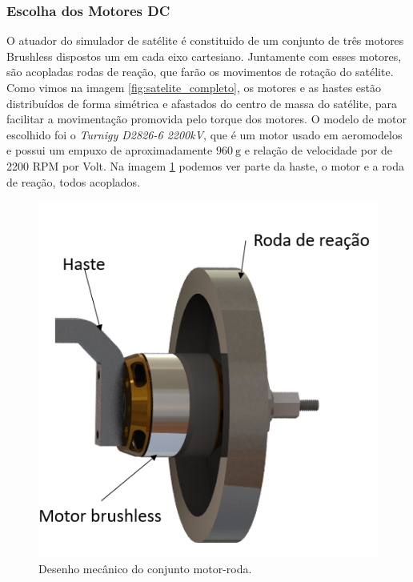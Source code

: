 
\subsubsection{Escolha dos Motores DC}

O atuador do simulador de satélite é constituido de um conjunto de três motores Brushless dispostos um em cada eixo cartesiano. Juntamente com esses motores, são acopladas rodas de reação, que farão os movimentos de rotação do satélite. Como vimos na imagem \ref{fig:satelite_completo}, os motores e as hastes estão distribuídos de forma simétrica e afastados do centro de massa do satélite, para facilitar a movimentação promovida pelo torque dos motores. O modelo de motor escolhido foi o \textit{Turnigy D2826-6 2200kV}, que é um motor usado em aeromodelos e possui um empuxo de aproximadamente $\SI{960}{\gram}$ e relação de velocidade por de 2200 RPM por Volt. Na imagem \ref{fig:motor_roda_desenho} podemos ver parte da haste, o motor e a roda de reação, todos acoplados. 

\begin{figure}[H]
  \caption{Desenho mecânico do conjunto motor-roda.}
  \begin{center}
      \includegraphics[scale=.45]{metodologia/img/motor_roda_desenho}
  \end{center}
  \label{fig:motor_roda_desenho}
\end{figure}

